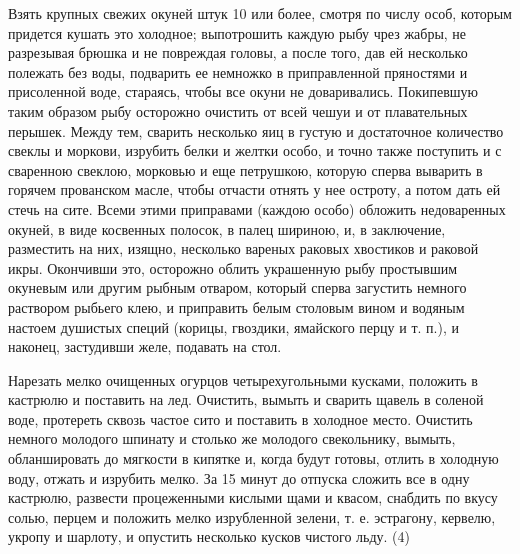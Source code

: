 Взять крупных свежих окуней штук 10 или более, смотря по числу особ, которым придется кушать это холодное; выпотрошить каждую рыбу чрез жабры, не разрезывая брюшка и не повреждая головы, а после того, дав ей несколько полежать без воды, подварить ее немножко в приправленной пряностями и присоленной воде, стараясь, чтобы все окуни не доваривались. Покипевшую таким образом рыбу осторожно очистить от всей чешуи и от плавательных перышек. Между тем, сварить несколько яиц в густую и достаточное количество свеклы и моркови, изрубить белки и желтки особо, и точно также поступить и с сваренною свеклою, морковью и еще петрушкою, которую сперва выварить в горячем прованском масле, чтобы отчасти отнять у нее остроту, а потом дать ей стечь на сите. Всеми этими приправами (каждою особо) обложить недоваренных окуней, в виде косвенных полосок, в палец шириною, и, в заключение, разместить на них, изящно, несколько вареных раковых хвостиков и раковой икры. Окончивши это, осторожно облить украшенную рыбу простывшим окуневым или другим рыбным отваром, который сперва загустить немного раствором рыбьего клею, и приправить белым столовым вином и водяным настоем душистых специй (корицы, гвоздики, ямайского перцу и т. п.), и наконец, застудивши желе, подавать на стол.


Нарезать мелко очищенных огурцов четырехугольными кусками, положить в кастрюлю и поставить на лед. Очистить, вымыть и сварить щавель в соленой воде, протереть сквозь частое сито и поставить в холодное место. Очистить немного молодого шпинату и столько же молодого свекольнику, вымыть, обланшировать до мягкости в кипятке и, когда будут готовы, отлить в холодную воду, отжать и изрубить мелко. За 15 минут до отпуска сложить все в одну кастрюлю, развести процеженными кислыми щами и квасом, снабдить по вкусу солью, перцем и положить мелко изрубленной зелени, т. е. эстрагону, кервелю, укропу и шарлоту, и опустить несколько кусков чистого льду. (4)


